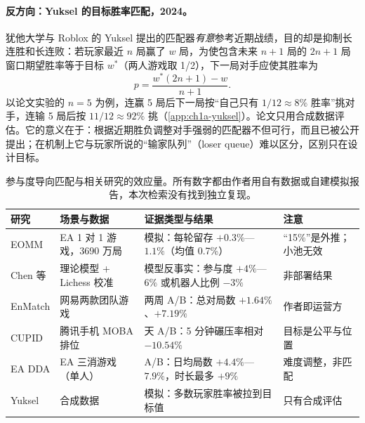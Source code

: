 \paragraph{反方向：Yuksel 的目标胜率匹配，2024。}犹他大学与 Roblox 的 Yuksel 提出的匹配器\emph{有意}参考近期战绩，目的却是抑制长连胜和长连败\cite{yuksel2024skill}\tagLit：若玩家最近 $n$ 局赢了 $w$ 局，为使包含未来 $n+1$ 局的 $2n+1$ 局窗口期望胜率等于目标 $w^*$（两人游戏取 1/2），下一局对手应使其胜率为
\begin{equation}\label{eq:1a-yuksel}
  p=\frac{w^*(2n+1)-w}{n+1}.
\end{equation}
以论文实验的 $n=5$ 为例，连赢 5 局后下一局按“自己只有 $1/12\approx8\%$ 胜率”挑对手，连输 5 局后按 $11/12\approx92\%$ 挑（\cref{app:ch1a-yuksel}）\tagOwn。论文只用合成数据评估。它的意义在于：根据近期胜负调整对手强弱的匹配器不但可行，而且已被公开提出；在机制上它与玩家所说的“输家队列”（loser queue）难以区分，区别只在设计目标。

\begin{table}[tbp]
  \centering\footnotesize
  \caption{参与度导向匹配与相关研究的效应量。所有数字都由作者用自有数据或自建模拟报告，本次检索没有找到独立复现。}
  \label{tab:1a-engage}
  \begin{tabularx}{\linewidth}{>{\raggedright\arraybackslash}p{2.3cm}>{\raggedright\arraybackslash}p{2.6cm}>{\raggedright\arraybackslash}X>{\raggedright\arraybackslash}p{3.0cm}}
    \toprule
    研究 & 场景与数据 & 证据类型与结果 & 注意 \\
    \midrule
    EOMM\cite{chen2017eomm} & EA 1 对 1 游戏，3690 万局 & 模拟：每轮留存 $+0.3\%$—$1.1\%$（均值 0.7\%） & “15\%”是外推；小池无效 \\
    Chen 等\cite{chen2026matchmaking} & 理论模型 + Lichess 校准 & 模型反事实：参与度 $+4\%$—$6\%$ 或机器人比例 $-3\%$ & 非部署结果 \\
    EnMatch\cite{wang2024enmatch} & 网易两款团队游戏 & 两周 A/B：总对局数 $+1.64\%$、$+7.19\%$ & 作者即运营方 \\
    CUPID\cite{fan2024cupid} & 腾讯手机 MOBA 排位 & 30 天 A/B：5 分钟碾压率相对 $-10.54\%$ & 目标是公平与位置 \\
    EA DDA\cite{xue2017dynamic} & EA 三消游戏（单人） & A/B：日均局数 $+4.4\%$—$7.9\%$，时长最多 $+9\%$ & 难度调整，非匹配 \\
    Yuksel\cite{yuksel2024skill} & 合成数据 & 模拟：多数玩家胜率被拉到目标值 & 只有合成评估 \\
    \bottomrule
  \end{tabularx}
\end{table}


